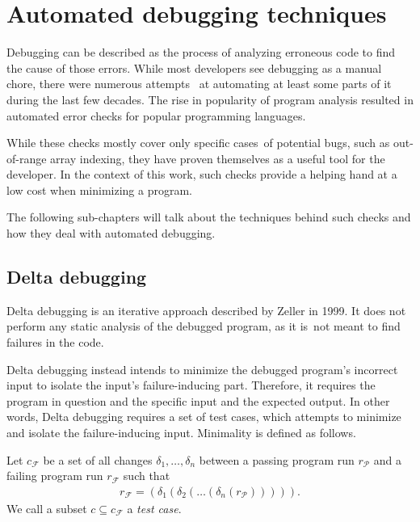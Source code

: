 \chapter{Automated debugging techniques}


Debugging can be described as the process of analyzing erroneous code to find 
the cause of those errors.
While most developers see debugging as a manual chore, there were numerous 
attempts~ at automating at least some parts of it during the last few decades. 
The rise in popularity of program analysis resulted in automated error checks 
for popular programming languages. 

While these checks mostly cover only specific 
cases~of potential bugs, such as out-of-range array indexing, they have proven 
themselves as a useful tool for the developer. In the context of this work, 
such checks provide a helping hand at a low cost when minimizing a program. 

The following sub-chapters will talk about the techniques behind such checks 
and how they deal with automated debugging.

\section{Delta debugging}

Delta debugging is an iterative approach described by Zeller in 1999. 
It does not perform any static analysis of the debugged program, as it 
is~not meant to find failures in the code. 

Delta debugging instead intends to 
minimize the debugged program's incorrect input to isolate the input's 
failure-inducing part. 
Therefore, it requires the program in question and the specific input 
and the expected output. 
In other words, Delta debugging requires a set of test cases, which attempts to 
minimize and isolate the failure-inducing input. Minimality is defined as follows.

\begin{defn}\label{def02:1}
  Let $c_\mathcal{F}$ be a set of all changes $\delta_1,\dots,\delta_n$ 
  between a passing program run $r_\mathcal{P}$ and a failing program run
  $r_\mathcal{F}$ such that 
  \begin{align}
	r_\mathcal{F} = (\delta_1(\delta_2(\dots(\delta_n(r_\mathcal{P}))))). \nonumber 
  \end{align}
  We call a subset $c \subseteq c_\mathcal{F}$ a \emph{test case}.
\end{defn}

